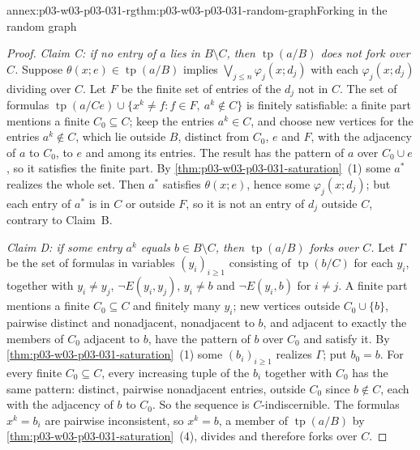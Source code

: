 \begin{annexitem}{annex:p03-w03-p03-031-rg}{thm:p03-w03-p03-031-random-graph}{Forking in the random graph}
\begin{proof}
\emph{Claim C: if no entry of \(a\) lies in \(B\setminus C\), then
\(\operatorname{tp}(a/B)\) does not fork over \(C\).}  Suppose
\(\theta(x;e)\in\operatorname{tp}(a/B)\) implies
\(\bigvee_{j\leq n}\varphi_j(x;d_j)\) with each \(\varphi_j(x;d_j)\) dividing
over \(C\).  Let \(F\) be the finite set of entries of the \(d_j\) not in
\(C\).  The set of formulas \(\operatorname{tp}(a/Ce)\cup\{x^k\neq f:f\in
F,\ a^k\notin C\}\) is finitely satisfiable: a finite part mentions a finite
\(C_0\subseteq C\); keep the entries \(a^k\in C\), and choose new vertices
for the entries \(a^k\notin C\), which lie outside \(B\), distinct from
\(C_0\), \(e\) and \(F\), with the adjacency of \(a\) to \(C_0\), to \(e\)
and among its entries.  The result has the pattern of \(a\) over
\(C_0\cup e\), so it satisfies the finite part.  By
\cref{thm:p03-w03-p03-031-saturation}~(1) some \(a^*\) realizes the whole
set.  Then \(a^*\) satisfies \(\theta(x;e)\), hence some
\(\varphi_j(x;d_j)\); but each entry of \(a^*\) is in \(C\) or outside
\(F\), so it is not an entry of \(d_j\) outside \(C\), contrary to Claim~B.

\emph{Claim D: if some entry \(a^k\) equals \(b\in B\setminus C\), then
\(\operatorname{tp}(a/B)\) forks over \(C\).}  Let \(\Gamma\) be the set of
formulas in variables \((y_i)_{i\geq1}\) consisting of
\(\operatorname{tp}(b/C)\) for each \(y_i\), together with \(y_i\neq y_j\),
\(\neg E(y_i,y_j)\), \(y_i\neq b\) and \(\neg E(y_i,b)\) for \(i\neq j\).  A
finite part mentions a finite \(C_0\subseteq C\) and finitely many
\(y_i\); new vertices outside \(C_0\cup\{b\}\), pairwise distinct and
nonadjacent, nonadjacent to \(b\), and adjacent to exactly the members of
\(C_0\) adjacent to \(b\), have the pattern of \(b\) over \(C_0\) and
satisfy it.  By \cref{thm:p03-w03-p03-031-saturation}~(1) some
\((b_i)_{i\geq1}\) realizes \(\Gamma\); put \(b_0=b\).  For every finite
\(C_0\subseteq C\), every increasing tuple of the \(b_i\) together with
\(C_0\) has the same pattern: distinct, pairwise nonadjacent entries,
outside \(C_0\) since \(b\notin C\), each with the adjacency of \(b\) to
\(C_0\).  So the sequence is \(C\)-indiscernible.  The formulas
\(x^k=b_i\) are pairwise inconsistent, so \(x^k=b\), a member of
\(\operatorname{tp}(a/B)\) by \cref{thm:p03-w03-p03-031-saturation}~(4),
divides and therefore forks over \(C\).


\end{proof}
\end{annexitem}
